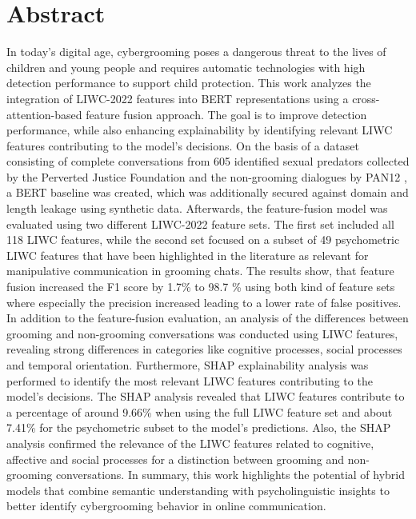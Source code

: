 \chapter{Abstract}

In today's digital age, cybergrooming poses a dangerous threat to the lives of children and young people and requires automatic technologies with high detection performance to support child protection. This work analyzes the integration of LIWC-2022 features \cite{pennebaker2022liwc} into BERT representations \cite{devlin2019bert} using a cross-attention-based feature fusion approach. The goal is to improve detection performance, while also enhancing explainability by identifying relevant LIWC features contributing to the model's decisions. On the basis of a dataset consisting of complete conversations from 605 identified sexual predators collected by the Perverted Justice Foundation and the  non-grooming dialogues by PAN12 \cite{inches2012pan}, a BERT baseline was created, which was additionally secured against domain and length leakage using synthetic data. Afterwards, the feature-fusion model was evaluated using two different LIWC-2022 feature sets. The first set included all 118 LIWC features, while the second set focused on a subset of 49 psychometric LIWC features that have been highlighted in the literature as relevant for manipulative communication in grooming chats. The results show, that feature fusion increased the F1 score by 1.7\% to 98.7 \% using both kind of feature sets where especially the precision increased leading to a lower rate of false positives. In addition to the feature-fusion evaluation, an analysis of the differences between grooming and non-grooming conversations was conducted using LIWC features, revealing strong differences in categories like cognitive processes, social processes and temporal orientation. Furthermore, SHAP \cite{lundberg2017shap} explainability analysis was performed to identify the most relevant LIWC features contributing to the model's decisions. The SHAP analysis revealed that LIWC features contribute to a percentage of around 9.66\% when using the full LIWC feature set and about 7.41\% for the psychometric subset to the model's predictions. Also, the SHAP analysis confirmed the relevance of the LIWC features related to cognitive, affective and social processes for a distinction between grooming and non-grooming conversations. In summary, this work highlights the potential of hybrid models that combine semantic understanding with psycholinguistic insights to better identify cybergrooming behavior in online communication.
